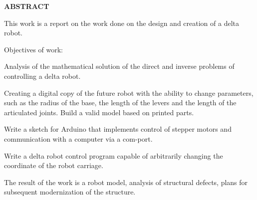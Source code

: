 


\begin{center}
\large{\textbf{ABSTRACT}}\\
\end{center}

This work is a report on the work done on the design and creation of a delta robot.

Objectives of work:

Analysis of the mathematical solution of the direct and inverse problems of controlling a delta robot.

Creating a digital copy of the future robot with the ability to change parameters, such as the radius of the base, the length of the levers and the length of the articulated joints. Build a valid model based on printed parts.

Write a sketch for Arduino that implements control of stepper motors and communication with a computer via a com-port.

Write a delta robot control program capable of arbitrarily changing the coordinate of the robot carriage.

The result of the work is a robot model, analysis of structural defects, plans for subsequent modernization of the structure.
